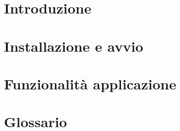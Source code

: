 \documentclass{article}
\begin{document}


\section{Introduzione}
\label{sec:introduzione}


\newpage
\section{Installazione e avvio}
\label{sec:inst}


\newpage
\section{Funzionalità applicazione}
\label{sec:funz}


\newpage
\appendix
\section{Glossario}
\label{sec:glossario}

\end{document}
